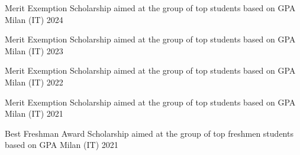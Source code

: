 
\begin{cvhonors}

  \cvhonor
  {Merit Exemption}
  {Scholarship aimed at the group of top students based on GPA}
  {Milan (IT)}
  {2024}

  \cvhonor
  {Merit Exemption}
  {Scholarship aimed at the group of top students based on GPA}
  {Milan (IT)}
  {2023}

  \cvhonor
  {Merit Exemption}
  {Scholarship aimed at the group of top students based on GPA}
  {Milan (IT)}
  {2022}

  \cvhonor
  {Merit Exemption}
  {Scholarship aimed at the group of top students based on GPA}
  {Milan (IT)}
  {2021}

  \cvhonor
  {Best Freshman Award}
  {Scholarship aimed at the group of top freshmen students based on GPA}
  {Milan (IT)}
  {2021}

\end{cvhonors}
